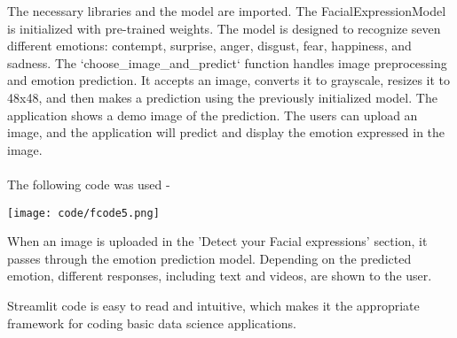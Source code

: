 \documentclass[11pt]{article}
\begin{document}
\noindent The necessary libraries and the model are imported. The FacialExpressionModel is initialized with pre-trained weights. The model is designed to recognize seven different emotions: contempt, surprise, anger, disgust, fear, happiness, and sadness. The `choose\_image\_and\_predict` function handles image preprocessing and emotion prediction. It accepts an image, converts it to grayscale, resizes it to 48x48, and then makes a prediction using the previously initialized model. The application shows a demo image of the prediction. The users can upload an image, and the application will predict and display the emotion expressed in the image.
\\ \\
\noindent The following code was used -
\begin{center}
    \texttt{[image: code/fcode5.png]}
\end{center}

When an image is uploaded in the 'Detect your Facial expressions' section, it passes through the emotion prediction model. Depending on the predicted emotion, different responses, including text and videos, are shown to the user.

Streamlit code is easy to read and intuitive, which makes it the appropriate framework for coding basic data science applications. 
\pagebreak
\end{document}
